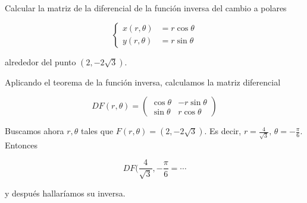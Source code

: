 \begin{problem}[9]
Calcular la matriz de la diferencial de la función inversa del cambio a polares

\[ \begin{cases}
x(r,θ) &= r\cos θ \\
y(r,θ) &= r\sin θ
\end{cases} \]

alrededor del punto $(2, -2\sqrt{3})$.

\solution

Aplicando el teorema de la función inversa, calculamos la matriz diferencial

\[  DF(r,θ) = \begin{pmatrix}
\cos θ & - r \sin θ \\
\sin θ & r \cos θ 
\end{pmatrix} \]

Buscamos ahora $r,θ$ tales que $F(r,θ) = (2, -2\sqrt{3})$. Es decir, $r=\frac{4}{\sqrt{3}},\,θ = -\frac{\pi }{6}$. Entonces

\[ DF(\frac{4}{\sqrt{3}}, -\frac{\pi }{6} = \dotsb \]

y después hallaríamos su inversa.

\end{problem}    
                         
